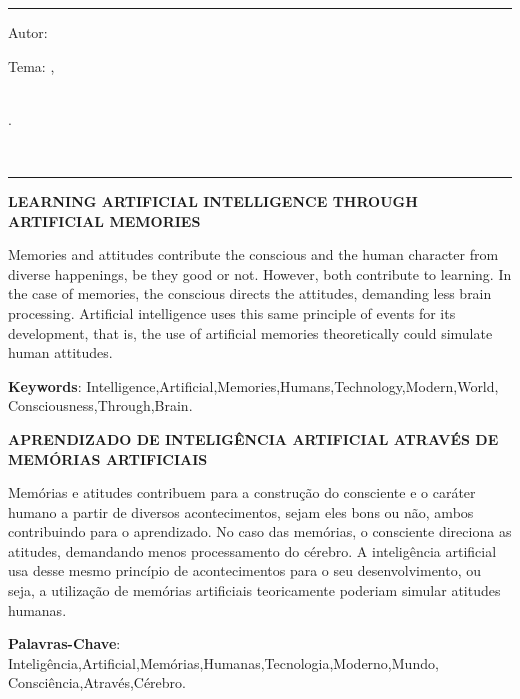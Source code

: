 

\hrule	%
\begin{center} %
\begin{minipage}[c]{12.5cm} %
Autor: \imprimirautor

Tema: \imprimirtitulo 
\imprimirlocal,\\ 
\imprimirorientador\\
\hspace{0.5cm}
\parbox[t]{\textwidth}{\imprimirinstituicao
\imprimirdata.}\\
\hspace{0.5cm}
\end{minipage}
\end{center}
\hrule

\vspace{1cm}

\SingleSpacing
\noindent
{\textbf{LEARNING ARTIFICIAL INTELLIGENCE THROUGH ARTIFICIAL MEMORIES}}
\indent
\small

Memories and attitudes contribute the conscious and the human character from diverse happenings, be they good or not. However, both contribute to learning. In the case of memories, the conscious directs the attitudes, demanding less brain processing. Artificial intelligence uses this same principle of events for its development, that is, the use of artificial memories theoretically could simulate human attitudes.

\noindent
 
\textbf{Keywords}: Intelligence,Artificial,Memories,Humans,Technology,Modern,World,
\\Consciousness,Through,Brain.

\SingleSpacing
\noindent
{\textbf{APRENDIZADO DE INTELIGÊNCIA ARTIFICIAL ATRAVÉS DE MEMÓRIAS ARTIFICIAIS}}
\indent
\small

Memórias e atitudes contribuem para a construção do consciente e o caráter humano a partir de diversos acontecimentos, sejam eles bons ou não, ambos contribuindo para o aprendizado. No caso das memórias, o consciente direciona as atitudes, demandando menos processamento do cérebro. A inteligência artificial usa desse mesmo princípio de acontecimentos para o seu desenvolvimento, ou seja, a utilização de memórias artificiais teoricamente poderiam simular atitudes humanas.

\noindent
 
\textbf{Palavras-Chave}: Inteligência,Artificial,Memórias,Humanas,Tecnologia,Moderno,Mundo,
\\Consciência,Através,Cérebro.

